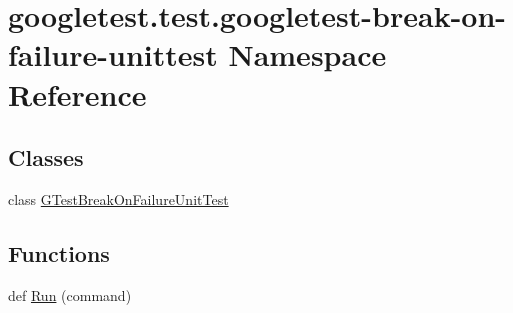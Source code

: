 \hypertarget{namespacegoogletest_1_1test_1_1googletest-break-on-failure-unittest}{}\section{googletest.\+test.\+googletest-\/break-\/on-\/failure-\/unittest Namespace Reference}
\label{namespacegoogletest_1_1test_1_1googletest-break-on-failure-unittest}
\subsection*{Classes}
\begin{DoxyCompactItemize}
\item 
class \mbox{\hyperlink{classgoogletest_1_1test_1_1googletest-break-on-failure-unittest_1_1_g_test_break_on_failure_unit_test}{G\+Test\+Break\+On\+Failure\+Unit\+Test}}
\end{DoxyCompactItemize}
\subsection*{Functions}
\begin{DoxyCompactItemize}
\item 
def \mbox{\hyperlink{namespacegoogletest_1_1test_1_1googletest-break-on-failure-unittest_a41207960c4384673ca09f521873c8161}{Run}} (command)
\end{DoxyCompactItemize}
